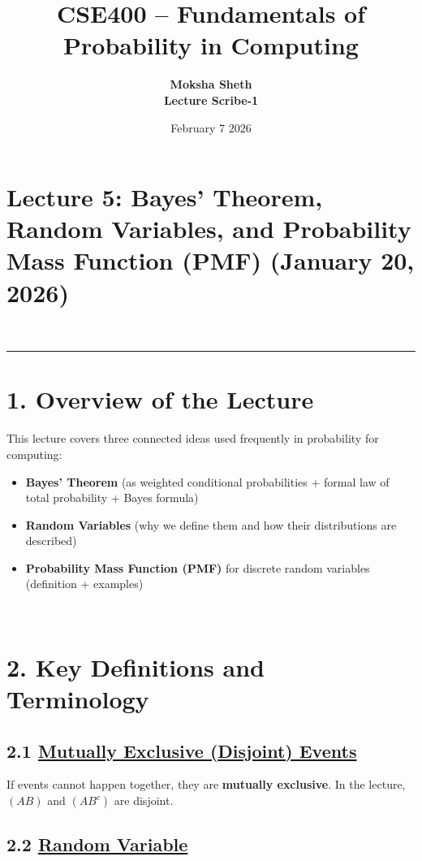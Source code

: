 \documentclass[11pt]{article}
\title{\textbf{CSE400 – Fundamentals of Probability in Computing}}
\author{\textbf{Moksha Sheth} \\\textbf{Lecture Scribe-1}}
\date{February 7 $2026$}
\begin{document}
\maketitle

\section*{Lecture 5: Bayes’ Theorem, Random Variables, and Probability Mass Function (PMF) (January 20, 2026)}\\

\hrule
\vspace{1.5cm}


\section*{1. Overview of the Lecture}

This lecture covers three connected ideas used frequently in probability for computing:

\begin{itemize}
\item \textbf{Bayes’ Theorem} (as weighted conditional probabilities + formal law of total probability + Bayes formula)
\item \textbf{Random Variables} (why we define them and how their distributions are described)
\item \textbf{Probability Mass Function (PMF)} for discrete random variables (definition + examples)
\end{itemize}\\

\vspace{1cm}
\section*{2. Key Definitions and Terminology}

\vspace{0.5cm}
\subsection*{2.1 \underline{Mutually Exclusive (Disjoint) Events}}

If events cannot happen together, they are \textbf{mutually exclusive}. In the lecture, $(AB)$ and $(AB^c)$ are disjoint.

\vspace{0.5cm}
\subsection*{2.2 \underline{Random Variable}}
\end{document}
